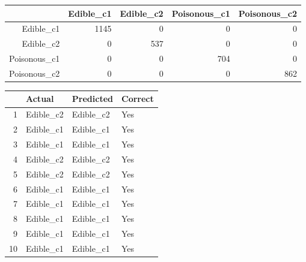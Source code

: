 \documentclass[10pt  ,usenames, dvipsnames]{article}\usepackage[]{graphicx}\usepackage[]{color}
\begin{document}
\begin{table}[ht]
\centering
\begin{tabular}{rrrrr}
  \hline
 & Edible\_c1 & Edible\_c2 & Poisonous\_c1 & Poisonous\_c2 \\ 
  \hline
Edible\_c1 & 1145 &   0 &   0 &   0 \\ 
  Edible\_c2 &   0 & 537 &   0 &   0 \\ 
  Poisonous\_c1 &   0 &   0 & 704 &   0 \\ 
  Poisonous\_c2 &   0 &   0 &   0 & 862 \\ 
   \hline
\end{tabular}
\end{table}




\begin{table}[ht]
\centering
\begin{tabular}{rlll}
  \hline
 & Actual & Predicted & Correct \\ 
  \hline
1 & Edible\_c2 & Edible\_c2 & Yes \\ 
  2 & Edible\_c1 & Edible\_c1 & Yes \\ 
  3 & Edible\_c1 & Edible\_c1 & Yes \\ 
  4 & Edible\_c2 & Edible\_c2 & Yes \\ 
  5 & Edible\_c2 & Edible\_c2 & Yes \\ 
  6 & Edible\_c1 & Edible\_c1 & Yes \\ 
  7 & Edible\_c1 & Edible\_c1 & Yes \\ 
  8 & Edible\_c1 & Edible\_c1 & Yes \\ 
  9 & Edible\_c1 & Edible\_c1 & Yes \\ 
  10 & Edible\_c1 & Edible\_c1 & Yes \\ 
   \hline
\end{tabular}
\end{table}
\end{document}

